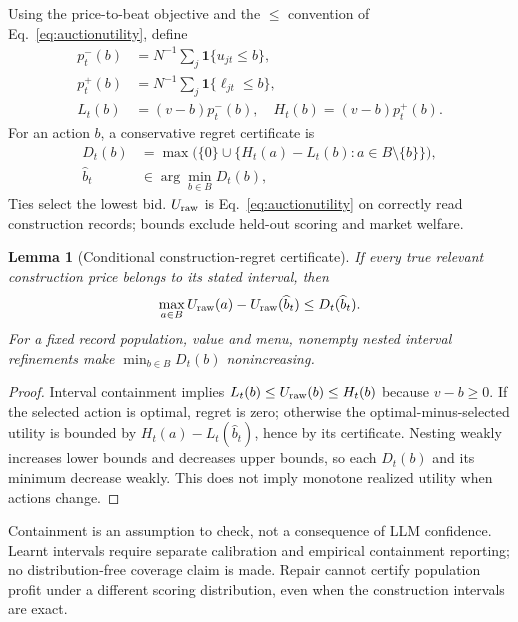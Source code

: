 \documentclass[sigconf,anonymous,nonacm]{acmart}
\newtheorem{repairlemma}{Lemma}
\begin{document}
Using the price-to-beat objective and the $\leq$ convention of Eq.~\ref{eq:auctionutility}, define
\[
\begin{aligned}
p_t^-(b)&=N^{-1}\sum_j\mathbf1\{u_{jt}\leq b\},\\
p_t^+(b)&=N^{-1}\sum_j\mathbf1\{\ell_{jt}\leq b\},\\
L_t(b)&=(v-b)p_t^-(b),\quad
H_t(b)=(v-b)p_t^+(b).
\end{aligned}
\]
For an action $b$, a conservative regret certificate is
\[
\begin{aligned}
D_t(b)&=\max\bigl(\{0\}\cup
\{H_t(a)-L_t(b):a\in B\setminus\{b\}\}\bigr),\\
\widehat b_t&\in\arg\min_{b\in B}D_t(b),
\end{aligned}
\]
Ties select the lowest bid. $U_{\rm raw}$ is Eq.~\ref{eq:auctionutility} on correctly read construction records; bounds exclude held-out scoring and market welfare.

\begin{repairlemma}[Conditional construction-regret certificate]\label{lem:repaircertificate}
If every true relevant construction price belongs to its stated interval, then
\[
\max_{a\in B}U_{\rm raw}(a)-U_{\rm raw}(\widehat b_t)
\leq D_t(\widehat b_t).
\]
For a fixed record population, value and menu, nonempty nested interval refinements make $\min_{b\in B}D_t(b)$ nonincreasing.
\end{repairlemma}
\begin{proof}
Interval containment implies $L_t(b)\leq U_{\rm raw}(b)\leq H_t(b)$ because $v-b\geq0$. If the selected action is optimal, regret is zero; otherwise the optimal-minus-selected utility is bounded by $H_t(a)-L_t(\widehat b_t)$, hence by its certificate. Nesting weakly increases lower bounds and decreases upper bounds, so each $D_t(b)$ and its minimum decrease weakly. This does not imply monotone realized utility when actions change.
\end{proof}
Containment is an assumption to check, not a consequence of LLM confidence. Learnt intervals require separate calibration and empirical containment reporting; no distribution-free coverage claim is made. Repair cannot certify population profit under a different scoring distribution, even when the construction intervals are exact.
\end{document}
